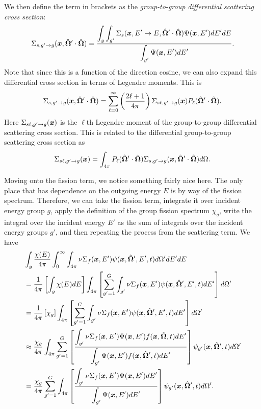 We then define the term in brackets as the \emph{group-to-group differential scattering cross section}:
\begin{align}
  \Sigma_{s,g' \rightarrow g}(\bm{x}, \hat{\mathbf{\Omega}}' \cdot \hat{\mathbf{\Omega}}) = \dfrac{ \displaystyle\int_g \int_{g'} \Sigma_s( \bm{x}, E' \rightarrow E, \hat{\mathbf{\Omega}}' \cdot \hat{\mathbf{\Omega}} ) \Psi(\bm{x},E') dE' dE }{ \displaystyle\int_{g'} \Psi(\bm{x},E') dE'  } .
\end{align}
Note that since this is a function of the direction cosine, we can also expand this differential cross section in terms of Legendre moments. This is
\begin{align}
  \Sigma_{s,g' \rightarrow g}(\bm{x}, \hat{\mathbf{\Omega}}' \cdot \hat{\mathbf{\Omega}}) = \sum_{\ell = 0}^\infty  \left( \frac{2\ell + 1}{4\pi} \right)  \Sigma_{s\ell,g' \rightarrow g}(\bm{x}) P_\ell(\hat{\mathbf{\Omega}}' \cdot \hat{\mathbf{\Omega}}).
\end{align}
Here $\Sigma_{s\ell,g' \rightarrow g}(\bm{x})$ is the $\ell$th Legendre moment of the group-to-group differential scattering cross section. This is related to the differential group-to-group scattering cross section as
\begin{align}
  \Sigma_{s\ell,g' \rightarrow g}(\bm{x}) = \int_{4\pi} P_\ell( \hat{\mathbf{\Omega}}' \cdot \hat{\mathbf{\Omega}} ) \Sigma_{s,g' \rightarrow g}(\bm{x}, \hat{\mathbf{\Omega}}' \cdot \hat{\mathbf{\Omega}}) d\Omega .
\end{align}

Moving onto the fission term, we notice something fairly nice here. The only place that has dependence on the outgoing energy $E$ is by way of the fission spectrum. Therefore, we can take the fission term, integrate it over incident energy group $g$, apply the definition of the group fission spectrum $\chi_g$, write the integral over the incident energy $E'$ as the sum of integrals over the incident energy groups $g'$, and then repeating the process from the scattering term. We have
\begin{align}
  &\int_g \frac{\chi(E)}{4\pi} \int_0^\infty \int_{4\pi} \nu \Sigma_f( \bm{x}, E') \psi( \bm{x}, \hat{\mathbf{\Omega}}', E',t ) d\Omega' dE' dE \nonumber \\
  &= \frac{1}{4\pi} \left[ \int_g \chi(E) dE \right] \int_{4\pi} \left[  \sum_{g'=1}^G \int_{g'} \nu\Sigma_f(\bm{x},E') \psi( \bm{x}, \hat{\mathbf{\Omega}}', E',t ) dE' \right] d\Omega' \nonumber \\
  &= \frac{1}{4\pi} \left[ \chi_g \right] \int_{4\pi}  \left[  \sum_{g'=1}^G \int_{g'} \nu\Sigma_f(\bm{x},E') \psi( \bm{x}, \hat{\mathbf{\Omega}}', E',t ) dE' \right] d\Omega' \nonumber \\
  &\approx \frac{\chi_g}{4\pi} \int_{4\pi} \sum_{g'=1}^G \left[ \dfrac{ \displaystyle\int_{g'} \nu\Sigma_f(\bm{x},E') \Psi(\bm{x},E') f(\bm{x},\hat{\mathbf{\Omega}},t) dE' }{ \displaystyle\int_{g'} \Psi(\bm{x},E') f(\bm{x},\hat{\mathbf{\Omega}}',t) dE'} \right] \psi_{g'}(\bm{x},\hat{\mathbf{\Omega}}',t) d\Omega' \nonumber \\
  &= \frac{\chi_g}{4\pi} \sum_{g'=1}^G  \int_{4\pi}  \left[ \dfrac{ \displaystyle\int_{g'} \nu\Sigma_f(\bm{x},E') \Psi(\bm{x},E') dE' }{ \displaystyle\int_{g'} \Psi(\bm{x},E') dE'} \right] \psi_{g'}(\bm{x},\hat{\mathbf{\Omega}}',t) d\Omega' .
\end{align}

